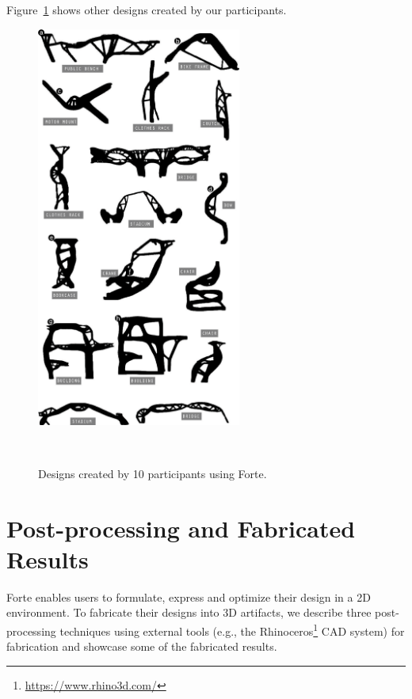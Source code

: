 Figure~\ref{fig:participants_design} shows other designs created by our participants.

\begin{figure} [h!]
 \centering
 \includegraphics[width=0.6\textwidth]{figures/participants_design}
 \caption{Designs created by 10 participants using Forte.}~\label{fig:participants_design}
\end{figure}


\section{Post-processing and Fabricated Results}
Forte enables users to formulate, express and optimize their design in a 2D environment. To  fabricate their designs into 3D artifacts, we describe three post-processing techniques using external tools (e.g., the Rhinoceros\footnote{\url{https://www.rhino3d.com/}} CAD system) for fabrication and showcase some of the fabricated results.


